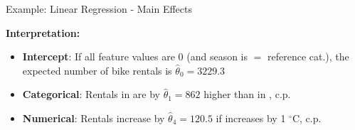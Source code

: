 \documentclass[11pt,compress,t,notes=noshow, aspectratio=169, xcolor=table]{beamer}
\begin{document}
\begin{frame}{Example: Linear Regression - Main Effects}
\lz


%
\textbf{Interpretation:}

\begin{itemize}[<+->]
    \item \textbf{Intercept}:
    If all feature values are 0 (and season is  $\hat =$ reference cat.), the expected number of bike rentals is $\hat\theta_0 = 3229.3$
    \item \textbf{Categorical}: Rentals in  are by $\hat\theta_1 = 862$ higher than in , c.p.
    \item \textbf{Numerical}: Rentals increase by $\hat\theta_4 = 120.5$ if  increases by 1 $^{\circ}$C, c.p.

\end{itemize}
\end{frame}

\endlecture
\end{document}
